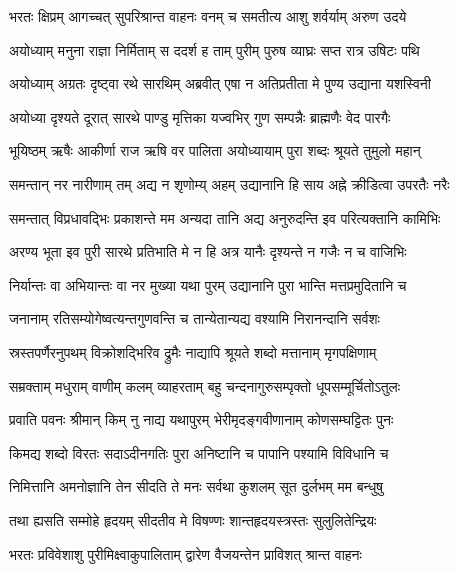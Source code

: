 \twolineshloka
{भरतः क्षिप्रम् आगच्चत् सुपरिश्रान्त वाहनः}
{वनम् च समतीत्य आशु शर्वर्याम् अरुण उदये} %

\twolineshloka
{अयोध्याम् मनुना राज्ञा निर्मिताम् स ददर्श ह}
{ताम् पुरीम् पुरुष व्याघ्रः सप्त रात्र उषिटः पथि} %

\twolineshloka
{अयोध्याम् अग्रतः दृष्ट्वा रथे सारथिम् अब्रवीत्}
{एषा न अतिप्रतीता मे पुण्य उद्याना यशस्विनी} %

\twolineshloka
{अयोध्या दृश्यते दूरात् सारथे पाण्डु मृत्तिका}
{यज्वभिर् गुण सम्पन्नैः ब्राह्मणैः वेद पारगैः} %

\twolineshloka
{भूयिष्ठम् ऋषैः आकीर्णा राज ऋषि वर पालिता}
{अयोध्यायाम् पुरा शब्दः श्रूयते तुमुलो महान्} %

\twolineshloka
{समन्तान् नर नारीणाम् तम् अद्य न शृणोम्य् अहम्}
{उद्यानानि हि साय अह्ने क्रीडित्वा उपरतैः नरैः} %

\twolineshloka
{समन्तात् विप्रधावद्भिः प्रकाशन्ते मम अन्यदा}
{तानि अद्य अनुरुदन्ति इव परित्यक्तानि कामिभिः} %

\twolineshloka
{अरण्य भूता इव पुरी सारथे प्रतिभाति मे}
{न हि अत्र यानैः दृश्यन्ते न गजैः न च वाजिभिः} %

\twolineshloka
{निर्यान्तः वा अभियान्तः वा नर मुख्या यथा पुरम्}
{उद्यानानि पुरा भान्ति मत्तप्रमुदितानि च} %

\twolineshloka
{जनानाम् रतिसम्योगेष्वत्यन्तगुणवन्ति च}
{तान्येतान्यद्य वश्यामि निरानन्दानि सर्वशः} %

\twolineshloka
{स्रस्तपर्णैरनुपथम् विक्रोशद्भिरिव द्रुमैः}
{नाद्यापि श्रूयते शब्दो मत्तानाम् मृगपक्षिणाम्} %

\twolineshloka
{सम्रक्ताम् मधुराम् वाणीम् कलम् व्याहरताम् बहु}
{चन्दनागुरुसम्पृक्तो धूपसम्मूर्चितोऽतुलः} %

\twolineshloka
{प्रवाति पवनः श्रीमान् किम् नु नाद्य यथापुरम्}
{भेरीमृदङ्गवीणानाम् कोणसम्घट्टितः पुनः} %

\twolineshloka
{किमद्य शब्दो विरतः सदाऽदीनगतिः पुरा}
{अनिष्टानि च पापानि पश्यामि विविधानि च} %

\twolineshloka
{निमित्तानि अमनोज्ञानि तेन सीदति ते मनः}
{सर्वथा कुशलम् सूत दुर्लभम् मम बन्धुषु} %

\twolineshloka
{तथा ह्यसति सम्मोहे हृदयम् सीदतीव मे}
{विषण्णः शान्तहृदयस्त्रस्तः सुलुलितेन्द्रियः} %

\twolineshloka
{भरतः प्रविवेशाशु पुरीमिक्ष्वाकुपालिताम्}
{द्वारेण वैजयन्तेन प्राविशत् श्रान्त वाहनः} %

